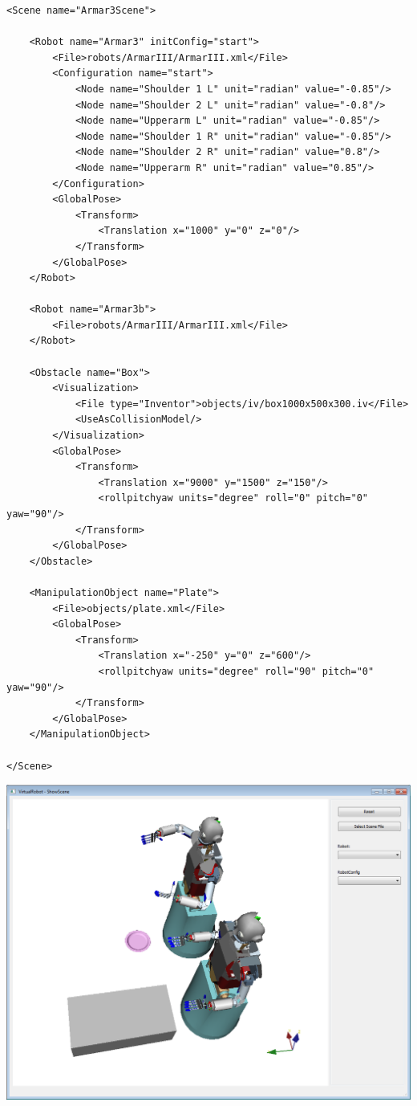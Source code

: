 \documentclass{book}
\begin{document}
\par
\begin{lstlisting}
<Scene name="Armar3Scene">

    <Robot name="Armar3" initConfig="start">
        <File>robots/ArmarIII/ArmarIII.xml</File>
        <Configuration name="start">
            <Node name="Shoulder 1 L" unit="radian" value="-0.85"/>
            <Node name="Shoulder 2 L" unit="radian" value="-0.8"/>
            <Node name="Upperarm L" unit="radian" value="-0.85"/>
            <Node name="Shoulder 1 R" unit="radian" value="-0.85"/>
            <Node name="Shoulder 2 R" unit="radian" value="0.8"/>
            <Node name="Upperarm R" unit="radian" value="0.85"/>
        </Configuration>
        <GlobalPose>
            <Transform>
                <Translation x="1000" y="0" z="0"/>
            </Transform>
        </GlobalPose>
    </Robot>

    <Robot name="Armar3b">
        <File>robots/ArmarIII/ArmarIII.xml</File>           
    </Robot>

    <Obstacle name="Box">
        <Visualization>
            <File type="Inventor">objects/iv/box1000x500x300.iv</File>
            <UseAsCollisionModel/>
        </Visualization>
        <GlobalPose>
            <Transform>
                <Translation x="9000" y="1500" z="150"/>
                <rollpitchyaw units="degree" roll="0" pitch="0" yaw="90"/>
            </Transform>
        </GlobalPose>
    </Obstacle>

    <ManipulationObject name="Plate">
        <File>objects/plate.xml</File>    
        <GlobalPose>
            <Transform>
                <Translation x="-250" y="0" z="600"/>
                <rollpitchyaw units="degree" roll="90" pitch="0" yaw="90"/>
            </Transform>
        </GlobalPose>
    </ManipulationObject>

</Scene>
\end{lstlisting}
\par
\includegraphics[width=\textwidth]{Tutorial10}
\par
\end{document}
